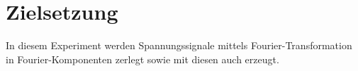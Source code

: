 \section{Zielsetzung}
\label{sec:Zielsetzung}
In diesem Experiment werden Spannungssignale mittels Fourier-Transformation
in Fourier-Komponenten zerlegt sowie mit diesen auch erzeugt.
